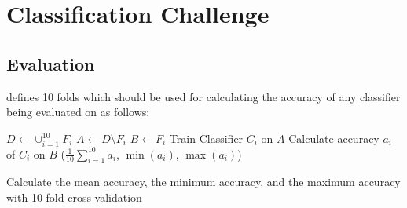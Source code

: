 \section{Classification Challenge}
\subsection{Evaluation}
\dbName{} defines 10 folds which should be used for calculating the accuracy
of any classifier being evaluated on \dbName{} as follows:

\begin{algorithm}[H]
    \begin{algorithmic}
            \State $D \gets \cup_{i=1}^{10} F_i$
                \State $A \gets D \setminus F_i$
                \State $B \gets F_i$
                \State Train Classifier $C_i$ on $A$
                \State Calculate accuracy $a_i$ of $C_i$ on $B$
            \EndFor
            \State \Return ($\frac{1}{10}\sum_{i=1}^{10} a_i$, $\min(a_i)$, $\max(a_i)$)
        \EndFunction
    \end{algorithmic}
    \caption{Calculate the mean accuracy, the minimum accuracy, and the maximum
             accuracy with 10-fold cross-validation}
\label{alg:seq1}
\end{algorithm}

